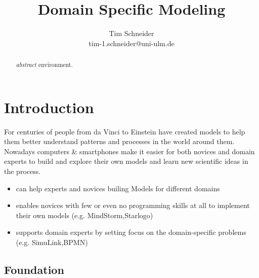 \documentclass[runningheads,a4paper]{llncs}
\begin{document}
\mainmatter  %

\title{Domain Specific Modeling}



\author{Tim Schneider\\ tim-1.schneider@uni-ulm.de}


\maketitle


\begin{abstract}
\emph{abstract} environment.
\end{abstract}


\section{Introduction}
\label{sec:introduction}
For centuries of people from da Vinci to Einstein have 
created models to help them better understand patterns and 
processes in the world around them. Nowadays computers \& smartphones make it easier 
for both novices and domain experts to build and explore 
their own models and learn new scientific ideas in the process.

\begin{itemize}
 \item can help experts and novices builing Models for different domains
 \item enables novices with few or even no programming skills at all to implement their own models (e.g. MindStorm,Starlogo)
 \item supports domain experts by setting focus on the domain-specific problems (e.g. SimuLink,BPMN)
  \end{itemize}


\subsection{Foundation}
\label{subsec:introduction}
\end{document}
